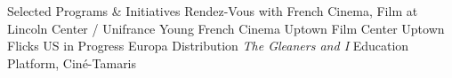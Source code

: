 \begin{rubric}{Selected Programs \& Initiatives}
\entry*[]%
Rendez-Vous with French Cinema, Film at Lincoln Center / Unifrance
\entry*[]%
Young French Cinema
\entry*[]%
Uptown Film Center
\entry*[]%
Uptown Flicks
\entry*[]%
US in Progress
\entry*[]%
Europa Distribution
\entry*[]%
\textit{The Gleaners and I} Education Platform, Cin\'e-Tamaris
\end{rubric}
